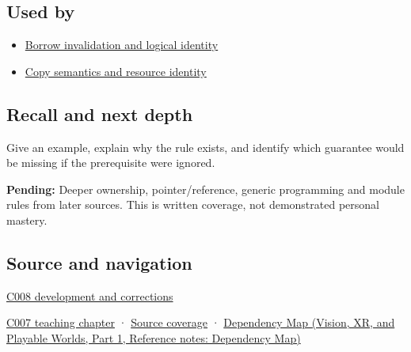 \subsection{Used by}\label{appendix-f1581457d322-used-by}

\hypertarget{appendix-f1581457d322-used-by}{}

\begin{itemize}
\tightlist
\item
  \hyperref[appendix-f9b8b9188c7f]{Borrow invalidation and logical identity}
\item
  \hyperref[appendix-1340cd1ce582]{Copy semantics and resource identity}
\end{itemize}

\subsection{Recall and next depth}\label{appendix-f1581457d322-recall-and-next-depth}

\hypertarget{appendix-f1581457d322-recall-and-next-depth}{}

Give an example, explain why the rule exists, and identify which guarantee would be missing if the prerequisite were ignored.

\textbf{Pending:} Deeper ownership, pointer/reference, generic programming and module rules from later sources. This is written coverage, not demonstrated personal mastery.

\subsection{Source and navigation}\label{appendix-f1581457d322-source-and-navigation}

\hypertarget{appendix-f1581457d322-source-and-navigation}{}

\hyperref[appendix-fd090d982a15-m008---parts-113-126]{C008 development and corrections}

\hyperref[01-foundations-i-ch002-values-occupants-and-addresses-tell-different-stories]{C007 teaching chapter} · \hyperref[appendix-fd090d982a15-m007---parts-101-112]{Source coverage} · \href{../07-Vision-XR-and-Playable-Worlds-P01/main.pdf\#nameddest=appendix-4ad47bdd269a}{Dependency Map (Vision, XR, and Playable Worlds, Part 1, Reference notes: Dependency Map)}
